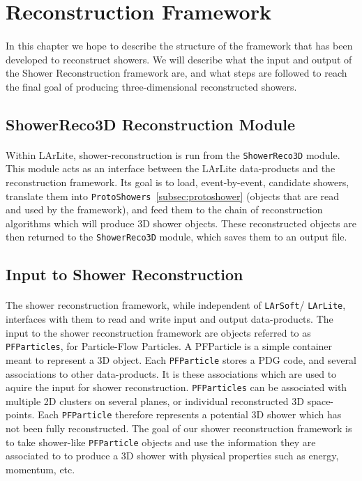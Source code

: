 \section{Reconstruction Framework}
\label{sec:framework}
\paragraph{}In this chapter we hope to describe the structure of the framework that has been developed to reconstruct showers. We will describe what the input and output of the Shower Reconstruction framework are, and what steps are followed to reach the final goal of producing three-dimensional reconstructed showers.

\subsection{ShowerReco3D Reconstruction Module}
\paragraph{}Within LArLite, shower-reconstruction is run from the \texttt{ShowerReco3D} module. This module acts as an interface between the LArLite data-products and the reconstruction framework. Its goal is to load, event-by-event, candidate showers, translate them into \texttt{ProtoShowers}~\ref{subsec:protoshower} (objects that are read and used by the framework), and feed them to the chain of reconstruction algorithms which will produce 3D shower objects. These reconstructed objects are then returned to the \texttt{ShowerReco3D} module, which saves them to an output file. 

\subsection{Input to Shower Reconstruction}
\paragraph{}The shower reconstruction framework, while independent of \texttt{LArSoft}/ \texttt{LArLite}, interfaces with them to read and write input and output data-products. The input to the shower reconstruction framework are objects referred to as \texttt{PFParticles}, for Particle-Flow Particles. A PFParticle is a simple container meant to represent a 3D object. Each \texttt{PFParticle} stores a PDG code, and several associations to other data-products. It is these associations which are used to aquire the input for shower reconstruction. \texttt{PFParticles} can be associated with multiple 2D clusters on several planes, or individual reconstructed 3D space-points. Each \texttt{PFParticle} therefore represents a potential 3D shower which has not been fully reconstructed. The goal of our shower reconstruction framework is to take shower-like \texttt{PFParticle} objects and use the information they are associated to to produce a 3D shower with physical properties such as energy, momentum, etc.
